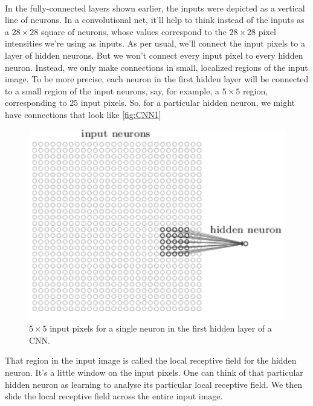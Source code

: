 {\paragraph{} In the fully-connected layers shown earlier, the inputs were depicted as a vertical line of neurons. In a convolutional net, it'll help to think instead of the inputs as a $28\times 28$ square of neurons, whose values correspond to the $28\times 28$ pixel intensities we're using as inputs. As per usual, we'll connect the input pixels to a layer of hidden neurons. But we won't connect every input pixel to every hidden neuron. Instead, we only make connections in small, localized regions of the input image. To be more precise, each neuron in the first hidden layer will be connected to a small region of the input neurons, say, for example, a $5\times5$ region, corresponding to $25$ input pixels. So, for a particular hidden neuron, we might have connections that look like \autoref{fig:CNN1}
\begin{figure}
\centering
\includegraphics[scale=0.5]{img/CNN1}
\caption{$5\times 5$ input pixels for a single neuron in the first hidden layer of a CNN.}
\label{fig:CNN1}
\end{figure}
That region in the input image is called the local receptive field for the hidden neuron. It's a little window on the input pixels. One can think of that particular hidden neuron as learning to analyse its particular local receptive field. We then slide the local receptive field across the entire input image.

}
